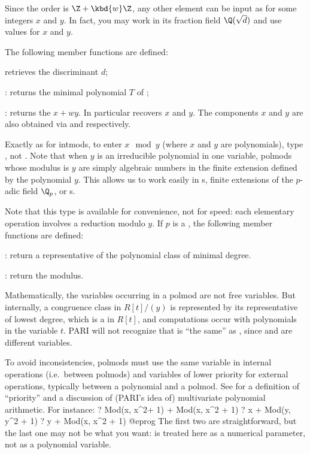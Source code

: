 Since the order is $\Z + \kbd{w}\Z$, any other element can be input
as  for some integers $x$ and $y$. In fact, you may work in
its fraction field $\Q(\sqrt{d})$ and use  values for $x$ and $y$.

The following member functions are defined:

 retrieves the discriminant $d$;

: returns the minimal polynomial $T$ of ;

: returns the  $x + wy$. In particular
 recovers $x$ and $y$. The components $x$
and $y$ are also obtained via  and  respectively.

%
Exactly as for intmods, to enter $x \mod y$ (where $x$ and $y$ are
polynomials), type , not . Note that when $y$ is an
irreducible polynomial in one variable, polmods whose modulus is $y$ are simply
algebraic numbers in the finite extension defined by the polynomial $y$.
This allows us to work easily in s, finite extensions of
the $p$-adic field $\Q_p$, or s.

Note that this type is available for convenience, not for speed: each
elementary operation involves a reduction modulo $y$.
If $p$ is a , the following member functions are defined:

: return a representative of the polynomial class of minimal degree.

: return the modulus.

\label{se:rempolmod}
Mathematically, the variables occurring in a polmod are not
free variables. But internally, a congruence class in $R[t]/(y)$ is
represented by its representative  of lowest degree, which is a  in
$R[t]$, and computations occur with polynomials in the variable $t$. PARI
will not recognize that  is ``the same'' as
, since  and  are different variables.

To avoid inconsistencies, polmods must use the same variable in internal
operations (i.e.~between polmods) and variables of lower priority for
external operations, typically between a polynomial and a polmod. See
 for a definition of ``priority'' and a discussion of
(PARI's idea of) multivariate polynomial arithmetic.
For instance:
\bprog
    ? Mod(x, x^2+ 1) + Mod(x, x^2 + 1)
    ? x + Mod(y, y^2 + 1)
    ? y + Mod(x, x^2 + 1)
@eprog\noindent
The first two are straightforward, but the last one may not be what you
want:  is treated here as a numerical parameter, not as a polynomial
variable.

